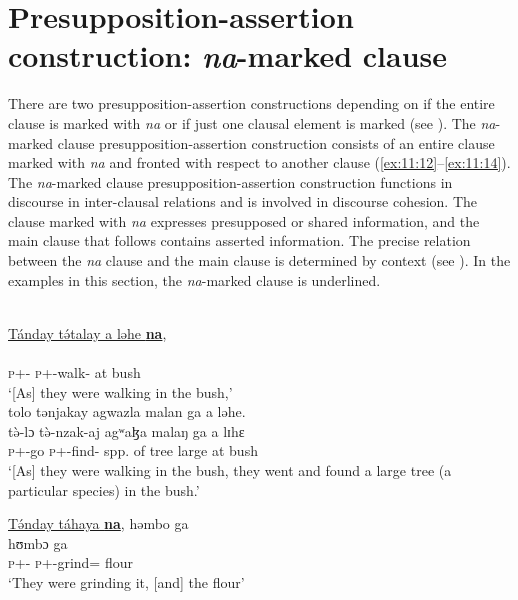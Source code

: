 \newpage 
\section{Presupposition-assertion construction: \textit{na}-marked clause}\label{sec:11.1}
\hypertarget{RefHeading1213161525720847}{}
There are two presupposition-assertion constructions depending on if the entire clause is marked with \textit{na} or if just one clausal element is marked (see ). The \textit{na}{}-marked clause presupposition-assertion construction consists of an entire clause marked with \textit{na}  and fronted with respect to another clause (\ref{ex:11:12}--\ref{ex:11:14}).  The \textit{na}{}-marked clause presupposition-assertion construction functions in discourse in inter-clausal relations and is involved in discourse cohesion. The clause marked with \textit{na} expresses presupposed or shared information, and the main clause that follows contains asserted information. The precise relation between the \textit{na} clause and the main clause is determined by context (see ).  In the examples in this section, the \textit{na}-marked clause is underlined. 

\ea \label{ex:11:12}
\\
\underline{Tánday  t\'ətalay  a  ləhe  \textbf{na}},\\  
\gll  {}      \\ 
      \textsc{p}+{\IFV}-{\PRG} \textsc{p}+{\IFV}-walk{}-{\CL} at bush {\PSP}\\  
\glt ‘[As] they were walking in the bush,’\\
      
      \medskip
tolo  tənjakay  agwazla  malan  ga  a  ləhe.\\      
\gll t\`{ə}-lɔ t\`{ə}-nzak-aj agʷaɮa malaŋ ga a lɪhɛ\\
     \textsc{p}+{\PFV}-go \textsc{p}+{\PFV}-find{}-{\CL} {spp. of tree}  large {\ADJ} at bush\\
\glt  ‘[As] they were walking in the bush, they went and found a large tree (a particular species) in the bush.’
\z

\ea \label{ex:11:13}
\underline{T\'ənday  táhaya  \textbf{na}},  həmbo  ga\\ 
\gll  {}   hʊmbɔ  ga \\ 
      \textsc{p}+{\IFV}-{\PRG}  \textsc{p}+{\IFV}-grind={\PLU}    {\PSP}     flour   {\ADJ} \\ 
\glt ‘They were grinding it, [and] the flour’ \\     
      
